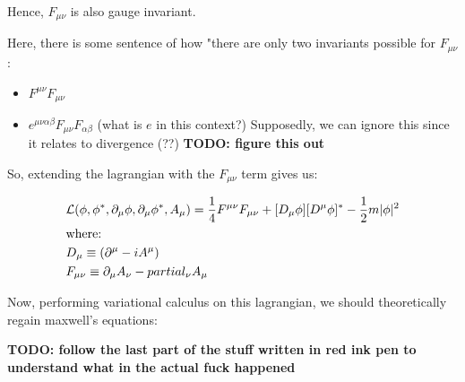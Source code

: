 Hence, $F_{\mu \nu}$ is also gauge invariant.

Here, there is some sentence of how "there are only two invariants possible
for $F_{\mu \nu}$:

\begin{itemize}
    \item $F^{\mu \nu} F_{\mu \nu}$
    \item $e^{\mu \nu \alpha \beta} F_{\mu \nu} F_{\alpha \beta}$ (what is $e$ in this context?)
        Supposedly, we can ignore this since it relates to divergence (??)
        \textbf{TODO: figure this out}
\end{itemize}

So, extending the lagrangian with the $F_{\mu \nu}$ term gives us:

\begin{align*}
    &\mathcal{L} (\phi, \phi^*, \partial_\mu \phi, \partial_\mu \phi^*, A_\mu) = 
    \frac{1}{4} F^{\mu \nu} F_{\mu \nu} + [D_\mu \phi][D^\mu \phi]^* - \frac{1}{2} m |\phi|^2 \\
    &\text{where:}\\
    &D_\mu \equiv (\partial^\mu - i A^\mu) \\
    &F_{\mu\nu} \equiv \partial_\mu A_\nu - partial_\nu A_\mu
\end{align*}

Now, performing variational calculus on this lagrangian, we should theoretically
regain maxwell's equations:

\textbf{TODO: follow the last part of the stuff written in red ink pen to
understand what in the actual fuck happened}


